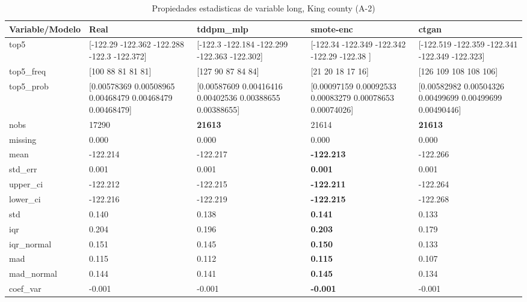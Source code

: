 \begin{table}[H]
\centering
\fontsize{8}{14}\selectfont
\caption{Propiedades  estadisticas de variable long, King county (A-2)}
\label{table-stats-king county-a-2-long}
\begin{tabular}{|l|m{10em}|m{10em}|m{10em}|m{10em}|}
\hline
 \rowcolor[gray]{0.8}
Variable/Modelo & Real & tddpm\_mlp & smote-enc & ctgan \\
\hline top5 & [-122.29  -122.362 -122.288 -122.3   -122.372] & [-122.3   -122.184 -122.299 -122.363 -122.302] & [-122.34  -122.349 -122.342 -122.29  -122.38 ] & [-122.519 -122.359 -122.341 -122.349 -122.323] \\
\hline top5\_freq & [100  88  81  81  81] & [127  90  87  84  84] & [21 20 18 17 16] & [126 109 108 108 106] \\
\hline top5\_prob & [0.00578369 0.00508965 0.00468479 0.00468479 0.00468479] & [0.00587609 0.00416416 0.00402536 0.00388655 0.00388655] & [0.00097159 0.00092533 0.00083279 0.00078653 0.00074026] & [0.00582982 0.00504326 0.00499699 0.00499699 0.00490446] \\
\hline nobs & 17290 & \bfseries 21613 & \cellcolor[rgb]{0.9, 0.54, 0.52} 21614 & \bfseries 21613 \\
\hline missing & 0.000 & 0.000 & 0.000 & 0.000 \\
\hline mean & -122.214 & -122.217 & \bfseries -122.213 & \cellcolor[rgb]{0.9, 0.54, 0.52} -122.266 \\
\hline std\_err & 0.001 & 0.001 & \bfseries 0.001 & \cellcolor[rgb]{0.9, 0.54, 0.52} 0.001 \\
\hline upper\_ci & -122.212 & -122.215 & \bfseries -122.211 & \cellcolor[rgb]{0.9, 0.54, 0.52} -122.264 \\
\hline lower\_ci & -122.216 & -122.219 & \bfseries -122.215 & \cellcolor[rgb]{0.9, 0.54, 0.52} -122.268 \\
\hline std & 0.140 & 0.138 & \bfseries 0.141 & \cellcolor[rgb]{0.9, 0.54, 0.52} 0.133 \\
\hline iqr & 0.204 & 0.196 & \bfseries 0.203 & \cellcolor[rgb]{0.9, 0.54, 0.52} 0.179 \\
\hline iqr\_normal & 0.151 & 0.145 & \bfseries 0.150 & \cellcolor[rgb]{0.9, 0.54, 0.52} 0.133 \\
\hline mad & 0.115 & 0.112 & \bfseries 0.115 & \cellcolor[rgb]{0.9, 0.54, 0.52} 0.107 \\
\hline mad\_normal & 0.144 & 0.141 & \bfseries 0.145 & \cellcolor[rgb]{0.9, 0.54, 0.52} 0.134 \\
\hline coef\_var & -0.001 & -0.001 & \bfseries -0.001 & \cellcolor[rgb]{0.9, 0.54, 0.52} -0.001 \\

\end{tabular}
\end{table}
